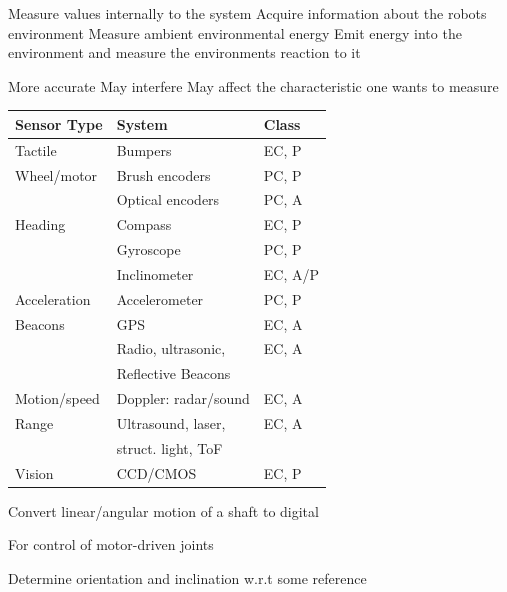 \begin{itemize}
     Measure values internally to the system
     Acquire information about the robots environment
     Measure ambient environmental energy
     Emit energy into the environment and measure the environments reaction to it
        \begin{itemize*}
            \ipro More accurate
            \icon May interfere
            \icon May affect the characteristic one wants to measure
        \end{itemize*}
        {\scriptsize
        \begin{tabular}{l l l}
            Sensor Type & System & Class\\\hline
            Tactile & Bumpers & EC, P \\
            Wheel/motor & Brush encoders & PC, P \\
            & Optical encoders & PC, A \\
            Heading & Compass & EC, P \\
            & Gyroscope & PC, P \\
            & Inclinometer & EC, A/P \\
            Acceleration & Accelerometer & PC, P \\
            Beacons & GPS & EC, A \\
                & Radio, ultrasonic, & EC, A \\
                & Reflective Beacons \\
            Motion/speed & Doppler: radar/sound & EC, A \\
            Range & Ultrasound, laser, & EC, A \\
                & struct. light, ToF \\
            Vision & CCD/CMOS & EC, P
        \end{tabular}}
        \begin{itemize*}
            \item Convert linear/angular motion of a shaft to digital
            \item For control of motor-driven joints
        \end{itemize*}
        \begin{itemize*}
            \item Determine orientation and inclination w.r.t some reference

\end{itemize*}
\end{itemize}
